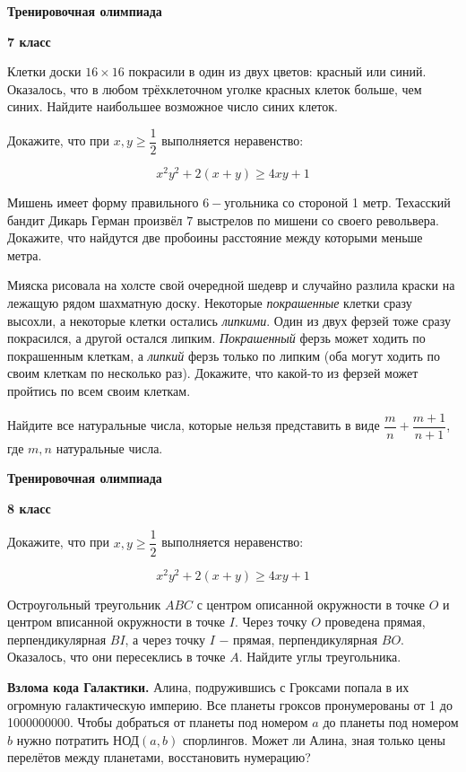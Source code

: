 \centerline{\bf \Huge Тренировочная олимпиада}
\centerline{\bf \Huge 7 класс}

Клетки доски $16\times 16$ покрасили в один из двух цветов: красный или синий. Оказалось, что в любом трёхклеточном уголке красных клеток больше, чем синих. Найдите наибольшее возможное число синих клеток.

 Докажите, что при $x, y \geq \dfrac{1}{2}$ выполняется неравенство:
 
\[ x^2y^2 + 2(x+y) \geq 4xy + 1 \]

Мишень имеет форму правильного $6-$угольника со стороной 1 метр. Техасский бандит Дикарь Герман произвёл $7$ выстрелов по мишени со своего револьвера. Докажите, что  найдутся две пробоины расстояние между которыми меньше метра.

Мияска рисовала на холсте свой очередной шедевр и случайно разлила краски на лежащую рядом шахматную доску. Некоторые \textit{покрашенные} клетки сразу высохли, а некоторые клетки остались \textit{липкими}. Один из двух ферзей тоже сразу покрасился, а другой остался липким. \textit{Покрашенный} ферзь может ходить по покрашенным клеткам, а \textit{липкий} ферзь только по липким (оба могут ходить по своим клеткам по несколько раз). Докажите, что какой-то из ферзей может пройтись по всем своим клеткам.

Найдите все натуральные числа, которые нельзя представить в виде $\dfrac{m}{n} + \dfrac{m+1}{n+1}$, где $m, n$ натуральные числа.

\newpage

\centerline{\bf \Huge Тренировочная олимпиада}
\centerline{\bf \Huge 8 класс}

 Докажите, что при $x, y \geq \dfrac{1}{2}$ выполняется неравенство:
 
\[ x^2y^2 + 2(x+y) \geq 4xy + 1 \]



Остроугольный треугольник $ABC$ с центром описанной окружности в точке $O$ и центром вписанной окружности в точке $I$. Через точку $O$ проведена прямая, перпендикулярная $BI$, а через точку $I$ $-$ прямая, перпендикулярная $BO$. Оказалось, что они пересеклись в точке $A$. Найдите углы треугольника.



\textbf{Взлома кода Галактики.} Алина, подружившись с Гроксами попала в их огромную галактическую империю. Все планеты гроксов пронумерованы от 1 до 1000000000. Чтобы добраться от планеты под номером $a$ до планеты под номером $b$ нужно потратить НОД$(a, b)$ спорлингов. Может ли Алина, зная только цены перелётов между планетами, восстановить нумерацию?


